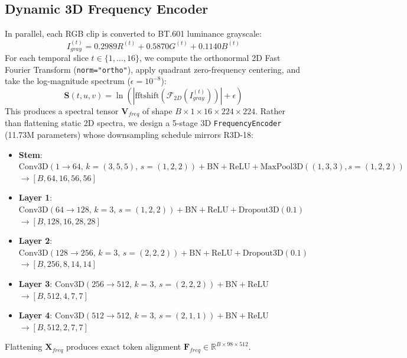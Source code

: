 \documentclass[conference,10pt]{IEEEtran}
\begin{document}
\subsection{Dynamic 3D Frequency Encoder}
In parallel, each RGB clip is converted to BT.601 luminance grayscale:
\begin{equation}
    I_{gray}^{(t)} = 0.2989 R^{(t)} + 0.5870 G^{(t)} + 0.1140 B^{(t)}
\end{equation}
For each temporal slice $t \in \{1,\dots,16\}$, we compute the orthonormal 2D Fast Fourier Transform (\texttt{norm="ortho"}), apply quadrant zero-frequency centering, and take the log-magnitude spectrum ($\epsilon = 10^{-8}$):
\begin{equation}
    \mathbf{S}(t, u, v) = \ln\!\left(\left|\text{fftshift}\!\left(\mathcal{F}_{2D}\!\left(I_{gray}^{(t)}\right)\right)\right| + \epsilon\right)
\end{equation}
This produces a spectral tensor $\mathbf{V}_{freq}$ of shape $B \times 1 \times 16 \times 224 \times 224$. Rather than flattening static 2D spectra, we design a 5-stage 3D \texttt{FrequencyEncoder} (11.73M parameters) whose downsampling schedule mirrors R3D-18:
\begin{itemize}[leftmargin=*]
    \item \textbf{Stem}: $\text{Conv3D}(1\rightarrow64,\, k=(3,5,5),\, s=(1,2,2)) + \text{BN} + \text{ReLU} + \text{MaxPool3D}((1,3,3), s=(1,2,2))$ $\rightarrow [B,64,16,56,56]$
    \item \textbf{Layer 1}: $\text{Conv3D}(64\rightarrow128,\, k=3,\, s=(1,2,2)) + \text{BN} + \text{ReLU} + \text{Dropout3D}(0.1)$ $\rightarrow [B,128,16,28,28]$
    \item \textbf{Layer 2}: $\text{Conv3D}(128\rightarrow256,\, k=3,\, s=(2,2,2)) + \text{BN} + \text{ReLU} + \text{Dropout3D}(0.1)$ $\rightarrow [B,256,8,14,14]$
    \item \textbf{Layer 3}: $\text{Conv3D}(256\rightarrow512,\, k=3,\, s=(2,2,2)) + \text{BN} + \text{ReLU}$ $\rightarrow [B,512,4,7,7]$
    \item \textbf{Layer 4}: $\text{Conv3D}(512\rightarrow512,\, k=3,\, s=(2,1,1)) + \text{BN} + \text{ReLU}$ $\rightarrow [B,512,2,7,7]$
\end{itemize}
Flattening $\mathbf{X}_{freq}$ produces exact token alignment $\mathbf{F}_{freq} \in \mathbb{R}^{B \times 98 \times 512}$.
\end{document}
